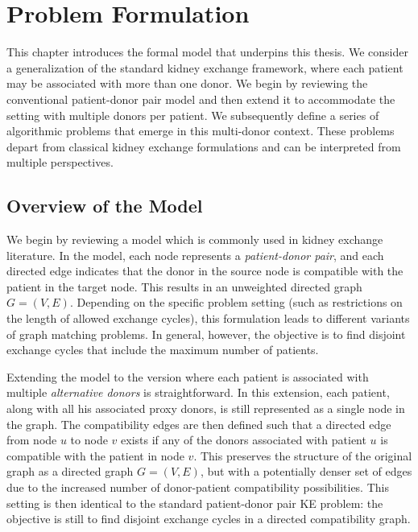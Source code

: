 \chapter{Problem Formulation}
\label{cha:problem_formulation}

This chapter introduces the formal model that underpins this thesis. We consider a generalization of the standard kidney exchange framework, where each patient may be associated with more than one donor. We begin by reviewing the conventional patient-donor pair model and then extend it to accommodate the setting with multiple donors per patient. We subsequently define a series of algorithmic problems that emerge in this multi-donor context. These problems depart from classical kidney exchange formulations and can be interpreted from multiple perspectives.%

\section{Overview of the Model}

We begin by reviewing a model which is commonly used in kidney exchange literature. In the model, each node represents a \textit{patient-donor pair}, and each directed edge indicates that the donor in the source node is compatible with the patient in the target node. This results in an unweighted directed graph $G = (V, E)$. Depending on the specific problem setting (such as restrictions on the length of allowed exchange cycles), this formulation leads to different variants of graph matching problems. In general, however, the objective is to find disjoint exchange cycles that include the maximum number of patients.

Extending the model to the version where each patient is associated with multiple \textit{alternative donors} is straightforward. In this extension, each patient, along with all his associated proxy donors, is still represented as a single node in the graph. The compatibility edges are then defined such that a directed edge from node $u$ to node $v$ exists if any of the donors associated with patient $u$ is compatible with the patient in node $v$. This preserves the structure of the original graph as a directed graph $G = (V, E)$, but with a potentially denser set of edges due to the increased number of donor-patient compatibility possibilities. This setting is then identical to the standard patient-donor pair KE problem: the objective is still to find disjoint exchange cycles in a directed compatibility graph.

